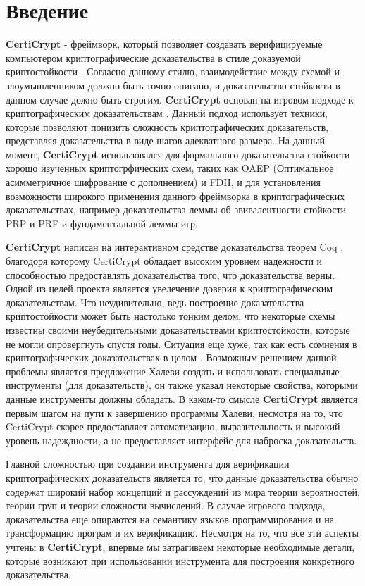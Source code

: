 \documentclass[a4paper,12pt]{report}
\begin{document}
\chapter{Введение}
\textbf{CertiCrypt} \cite{1} - фреймворк, который позволяет создавать верифицируемые компьютером криптографические доказательства в стиле доказуемой криптостойкости \cite{2, 3}. Согласно данному стилю, взаимодействие между схемой и злоумышленником должно быть точно описано, и доказательство стойкости в данном случае дожно быть строгим. \textbf{CertiCrypt} основан на игровом подходе к криптографическим доказательствам \cite{4,5,6}. Данный подход использует техники, которые позволяют понизить сложность криптографических доказательств, представляя доказательства в виде шагов адекватного размера. На данный момент, \textbf{CertiCrypt} использовался для формального доказательства стойкости хорошо изученных криптогрфических схем, таких как OAEP (Оптимальное асимметричное шифрование с дополнением) и FDH, и для установления возможности широкого применения данного фреймворка в криптографических доказательствах, например доказательства леммы об эвивалентности стойкости PRP и PRF и фундаментальной леммы игр. 
\par
\textbf{CertiCrypt} написан на интерактивном средстве доказательства теорем Coq \cite{7}, благодоря которому CertiCrypt обладает высоким уровнем надежности и способностью предоставлять доказательства того, что доказательства верны. Одной из целей проекта является увелечение доверия к криптографическим доказательствам. Что неудивительно, ведь построение доказательства криптостойкости может быть настолько тонким делом, что некоторые схемы известны своими неубедительными доказательствами криптостойкости, которые не могли опровергнуть спустя годы. Ситуация еще хуже, так как есть сомнения в криптографических доказательствах в целом \cite{4, 5}. Возможным решением данной проблемы является предложение Халеви \cite{5} создать и использовать специальные инструменты (для доказательств), он также указал некоторые свойства, которыми данные инструменты должны обладать. В каком-то смысле \textbf{CertiCrypt} является первым шагом на пути к завершению программы Халеви, несмотря на то, что CertiCrypt скорее предоставляет автоматизацию, выразительность и высокий уровень надеждности, а не предоставляет интерфейс для наброска доказательств.
\par
Главной сложностью при создании инструмента для верификации криптографических доказательств является то, что данные доказательства обычно содержат широкий набор концепций и рассуждений из мира теории вероятностей, теории груп и теории сложности вычислений. В случае игрового подхода, доказательства еще опираются на семантику языков программирования и на трансформацию програм и их верификацию. Несмотря на то, что все эти аспекты учтены в \textbf{CertiCrypt}, впервые мы затрагиваем некоторые необходимые детали, которые возникают при использовании инструмента для построения конкретного доказательства.
\end{document}
